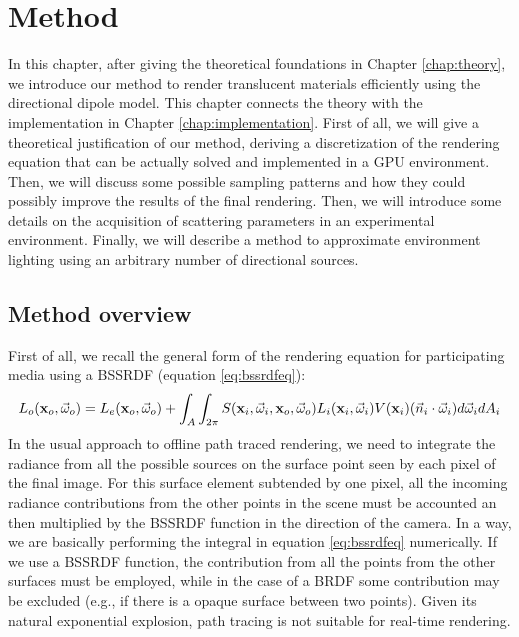 \chapter{Method}
\label{chap:method}
In this chapter, after giving the theoretical foundations in Chapter \ref{chap:theory}, we introduce our method to render translucent materials efficiently using the directional dipole model. This chapter connects the theory with the implementation in Chapter \ref{chap:implementation}. First of all, we will give a theoretical justification of our method, deriving a discretization of the rendering equation that can be actually solved and implemented in a GPU environment. Then, we will discuss some possible sampling patterns and how they could possibly improve the results of the final rendering. Then, we will introduce some details on the acquisition of scattering parameters in an experimental environment. Finally, we will describe a method to approximate environment lighting using an arbitrary number of directional sources.

\section{Method overview}
\label{sec:m_overv}
First of all, we recall the general form of the rendering equation for participating media using a BSSRDF (equation \ref{eq:bssrdfeq}):
\begin{equation*}
L_o(\mathbf{x}_o,\vec{\omega}_o) = L_e(\mathbf{x}_o,\vec{\omega}_o) + \int_A \int_{2\pi} S(\mathbf{x}_i, \vec{\omega}_i, \mathbf{x}_o, \vec{\omega}_o) L_i(\mathbf{x}_i,\vec{\omega}_i) V(\mathbf{x}_i) (\vec{n}_i \cdot \vec{\omega}_i) d\vec{\omega}_i d A_i
\end{equation*}
In the usual approach to offline path traced rendering, we need to integrate the radiance from all the possible sources on the surface point seen by each pixel of the final image. For this surface element subtended by one pixel, all the incoming radiance contributions from the other points in the scene must be accounted an then multiplied by the BSSRDF function in the direction of the camera. In a way, we are basically performing the integral in equation \ref{eq:bssrdfeq} numerically. If we use a BSSRDF function, the contribution from all the points from the other surfaces must be employed, while in the case of a BRDF some contribution may be excluded (e.g., if there is a opaque surface between two points). Given its natural exponential explosion, path tracing is not suitable for real-time rendering.

